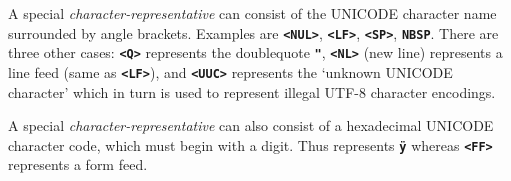 \documentclass[12pt]{article}
\newcommand{\TT}[1]{{\tt \bfseries #1}}
\newlength{\figurewidth}
\newenvironment{boxedfigure}[1][!btp]%
	{\begin{figure*}[#1]
	 \begin{lrbox}{\figurebox}
	 \begin{minipage}{\figurewidth}

	 \vspace*{1ex}}%
	{
	 \vspace*{1ex}

	 \end{minipage}
	 \end{lrbox}

	 \centering
	 \fbox{\hspace*{0.1in}\usebox{\figurebox}\hspace*{0.1in}}
	 \end{figure*}}
\newenvironment{indpar}[1][0.3in]%
	{\begin{list}{}%
		     {\setlength{\itemsep}{0in}%
		      \setlength{\topsep}{0in}%
		      \setlength{\parsep}{1ex}%
		      \setlength{\labelwidth}{#1}%
		      \setlength{\leftmargin}{#1}%
		      \addtolength{\leftmargin}{\labelsep}}%
	 \item}%
	{\end{list}}
\begin{document}
A special {\em character-representative} can consist of
the UNICODE character name surrounded by angle brackets.  Examples are
\TT{<NUL>}, \TT{<LF>}, \TT{<SP>}, \TT{NBSP}.  There are three other cases:
\TT{<Q>} represents the doublequote \TT{"}, \TT{<NL>} (new line)
represents a line feed (same as \TT{<LF>}), and \TT{<UUC>} represents
the `unknown UNICODE character' which in turn is used to represent
illegal UTF-8 character encodings.

A special {\em character-representative} can also consist of
a hexadecimal UNICODE character code, which must begin with a digit.
Thus \TT{<0FF>} represents \TT{\"y} whereas \TT{<FF>} represents
a form feed.

\begin{boxedfigure}[!p]
\begin{indpar}


\end{indpar}
\end{boxedfigure}
\end{document}
